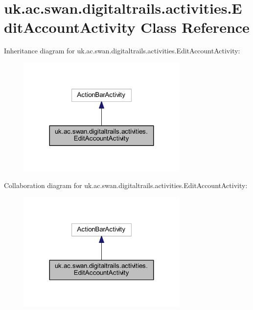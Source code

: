 \hypertarget{classuk_1_1ac_1_1swan_1_1digitaltrails_1_1activities_1_1_edit_account_activity}{\section{uk.\+ac.\+swan.\+digitaltrails.\+activities.\+Edit\+Account\+Activity Class Reference}
\label{classuk_1_1ac_1_1swan_1_1digitaltrails_1_1activities_1_1_edit_account_activity}
}


Inheritance diagram for uk.\+ac.\+swan.\+digitaltrails.\+activities.\+Edit\+Account\+Activity\+:\nopagebreak
\begin{figure}[H]
\begin{center}
\leavevmode
\includegraphics[width=239pt]{classuk_1_1ac_1_1swan_1_1digitaltrails_1_1activities_1_1_edit_account_activity__inherit__graph}
\end{center}
\end{figure}


Collaboration diagram for uk.\+ac.\+swan.\+digitaltrails.\+activities.\+Edit\+Account\+Activity\+:\nopagebreak
\begin{figure}[H]
\begin{center}
\leavevmode
\includegraphics[width=239pt]{classuk_1_1ac_1_1swan_1_1digitaltrails_1_1activities_1_1_edit_account_activity__coll__graph}
\end{center}
\end{figure}
